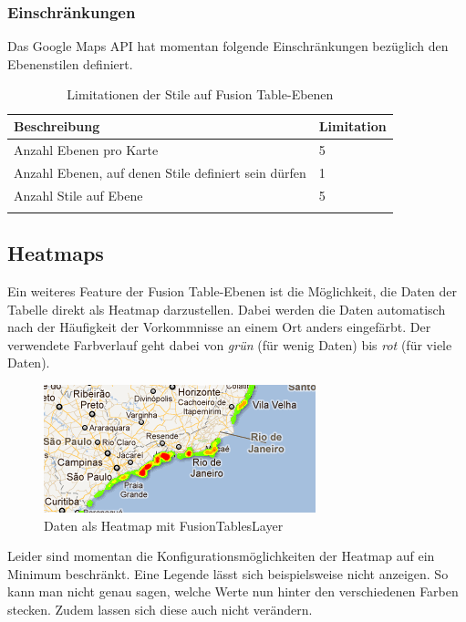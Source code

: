 \subsubsection{Einschränkungen}
\label{fusiontableslayer-styles-restrictions}
Das Google Maps \gls{API} hat momentan folgende Einschränkungen bezüglich den Ebenenstilen definiert.

\begin{longtable}{|l|l|}
\hline 
\textbf{Beschreibung} & \textbf{Limitation} \\ 
\hline 
Anzahl Ebenen pro Karte & 5 \\ 
\hline 
Anzahl Ebenen, auf denen Stile definiert sein dürfen & 1 \\ 
\hline 
Anzahl Stile auf Ebene & 5 \\ 
\hline 
\caption{Limitationen der Stile auf Fusion Table-Ebenen}
\label{fusiontableslayer-stlyes-limitations}
\end{longtable} 

\subsection{Heatmaps}
Ein weiteres Feature der Fusion Table-Ebenen ist die Möglichkeit, die Daten der Tabelle direkt als Heatmap darzustellen. Dabei werden die Daten automatisch nach der Häufigkeit der Vorkommnisse an einem Ort anders eingefärbt. Der verwendete Farbverlauf geht dabei von \emph{grün} (für wenig Daten) bis \emph{rot} (für viele Daten).

\begin{figure}[!ht]
	\centering
	\includegraphics{images/einfuehrung/gmap_fusiontableslayer_heatmap}
	\caption{Daten als Heatmap mit FusionTablesLayer}
	\label{fusiontableslayer-heatmap}
\end{figure}

Leider sind momentan die Konfigurationsmöglichkeiten der Heatmap auf ein Minimum beschränkt. Eine Legende lässt sich beispielsweise nicht anzeigen. So kann man nicht genau sagen, welche Werte nun hinter den verschiedenen Farben stecken. Zudem lassen sich diese auch nicht verändern.

